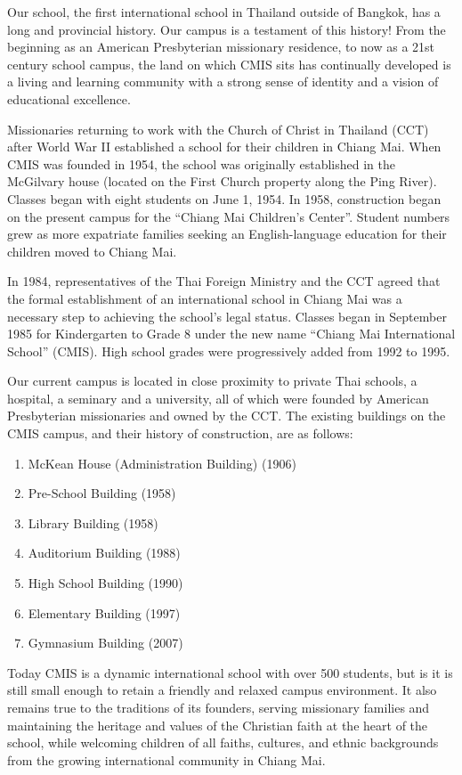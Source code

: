 \documentclass{report}
\begin{document}
Our school, the first international school in Thailand outside of Bangkok, has a long and provincial history.  Our campus is a testament of this history!  From the beginning as an American Presbyterian missionary residence, to now as a 21st century school campus, the land on which CMIS sits has continually developed is a living and learning community with a strong sense of identity and a vision of educational excellence.  

Missionaries returning to work with the Church of Christ in Thailand (CCT) after World War II established a school for their children in Chiang Mai.  When CMIS was founded in 1954, the school was originally established in the McGilvary house (located on the First Church property along the Ping River).  Classes began with eight students on June 1, 1954.  In 1958, construction began on the present campus for the “Chiang Mai Children’s Center”.   Student numbers grew as more expatriate families seeking an English-language education for their children moved to Chiang Mai.

In 1984, representatives of the Thai Foreign Ministry and the CCT agreed that the formal establishment of an international school in Chiang Mai was a necessary step to achieving the school’s legal status.  Classes began in September 1985 for Kindergarten to Grade 8 under the new name “Chiang Mai International School” (CMIS).  High school grades were progressively added from 1992 to 1995.  

Our current campus is located in close proximity to private Thai schools, a hospital, a seminary and a university, all of which were founded by American Presbyterian missionaries and owned by the CCT.  The existing buildings on the CMIS campus, and their history of construction, are as follows: 
\begin{enumerate}
\item McKean House (Administration Building) (1906)
\item Pre-School Building (1958)
\item Library Building (1958)
\item Auditorium Building (1988)
\item High School Building (1990)
\item Elementary Building (1997)
\item Gymnasium Building (2007)
\end{enumerate}
Today CMIS is a dynamic international school with over 500 students, but is it is still small enough to retain a friendly and relaxed campus environment.  It also remains true to the traditions of its founders, serving missionary families and maintaining the heritage and values of the Christian faith at the heart of the school, while welcoming children of all faiths, cultures, and ethnic backgrounds from the growing international community in Chiang Mai.  
\end{document}

